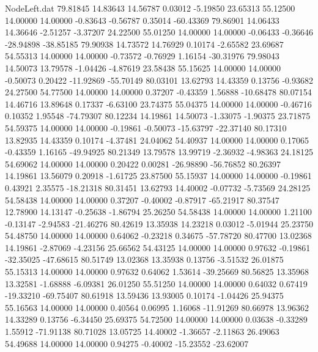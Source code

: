 \begin{filecontents}{NodeLeft.dat}
  79.81845   14.83643   14.56787     0.03012   -5.19850   23.65313   55.12500   14.00000   14.00000   -0.83643   -0.56787    0.35014  -60.43369
  79.86901   14.06433   14.36646    -2.51257   -3.37207   24.22500   55.01250   14.00000   14.00000   -0.06433   -0.36646  -28.94898  -38.85185
  79.90938   14.73572   14.76929     0.10174   -2.65582   23.69687   54.55313   14.00000   14.00000   -0.73572   -0.76929    1.16154  -30.31976
  79.98043   14.50073   13.79578    -1.04426   -4.87619   23.58438   55.15625   14.00000   14.00000   -0.50073    0.20422  -11.92869  -55.70149
  80.03101   13.62793   14.43359     0.13756   -0.93682   24.27500   54.77500   14.00000   14.00000    0.37207   -0.43359    1.56888  -10.68478
  80.07154   14.46716   13.89648     0.17337   -6.63100   23.74375   55.04375   14.00000   14.00000   -0.46716    0.10352    1.95548  -74.79307
  80.12234   14.19861   14.50073    -1.33075   -1.90375   23.71875   54.59375   14.00000   14.00000   -0.19861   -0.50073  -15.63797  -22.37140
  80.17310   13.82935   14.43359     0.10174   -4.37481   24.04062   54.40937   14.00000   14.00000    0.17065   -0.43359    1.16165  -49.94925
  80.21349   13.79578   13.99719    -2.36932   -4.98363   24.18125   54.69062   14.00000   14.00000    0.20422    0.00281  -26.98890  -56.76852
  80.26397   14.19861   13.56079     0.20918   -1.61725   23.87500   55.15937   14.00000   14.00000   -0.19861    0.43921    2.35575  -18.21318
  80.31451   13.62793   14.40002    -0.07732   -5.73569   24.28125   54.58438   14.00000   14.00000    0.37207   -0.40002   -0.87917  -65.21917
  80.37547   12.78900   14.13147    -0.25638   -1.86794   25.26250   54.58438   14.00000   14.00000    1.21100   -0.13147   -2.94583  -21.46276
  80.42619   13.35938   14.23218     0.03012   -5.01944   25.23750   54.48750   14.00000   14.00000    0.64062   -0.23218    0.34675  -57.78720
  80.47700   13.02368   14.19861    -2.87069   -4.23156   25.66562   54.43125   14.00000   14.00000    0.97632   -0.19861  -32.35025  -47.68615
  80.51749   13.02368   13.35938     0.13756   -3.51532   26.01875   55.15313   14.00000   14.00000    0.97632    0.64062    1.53614  -39.25669
  80.56825   13.35968   13.32581    -1.68888   -6.09381   26.01250   55.51250   14.00000   14.00000    0.64032    0.67419  -19.33210  -69.75407
  80.61918   13.59436   13.93005     0.10174   -1.04426   25.94375   55.16563   14.00000   14.00000    0.40564    0.06995    1.16068  -11.91269
  80.66978   13.96362   14.33289     0.13756   -6.34450   25.69375   54.72500   14.00000   14.00000    0.03638   -0.33289    1.55912  -71.91138
  80.71028   13.05725   14.40002    -1.36657   -2.11863   26.49063   54.49688   14.00000   14.00000    0.94275   -0.40002  -15.23552  -23.62007

\end{filecontents}
